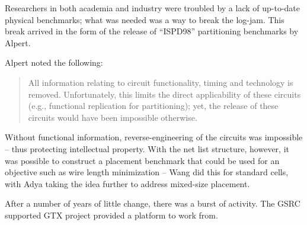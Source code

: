 \documentclass[sigconf]{acmart}
\begin{document}
Researchers in both academia and industry were troubled
by a lack of up-to-date physical benchmarks; what was
needed was a way to break the log-jam.
This break
arrived in the form of the release of ``ISPD98'' partitioning
benchmarks by Alpert\cite{Alpert980080}.

Alpert noted the following:
\begin{quote}
All information relating to circuit functionality, timing and
technology is removed. Unfortunately, this limits the direct
applicability of these circuits (e.g., functional replication for
partitioning); yet, the release of these circuits would have been
impossible otherwise. \cite{Alpert980080}
\end{quote}

Without functional information, reverse-engineering of the circuits
was impossible -- thus protecting intellectual property.
With the net list structure, however, it was possible to construct
a placement benchmark that could be used for an objective such
as wire length minimization -- Wang\cite{Wang000260} did this
for standard cells, with Adya\cite{Adya020012} taking the idea
further to address mixed-size placement.  


After a number of years of little change, there was a burst of
activity.  The
GSRC supported GTX project \cite{Caldwell000693} provided a platform
to work from.









\end{document}
